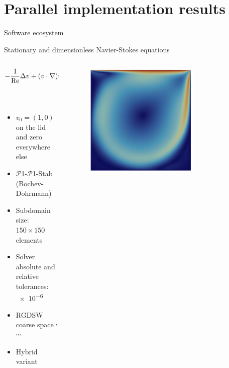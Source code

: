 \section{Parallel implementation results}

\begin{frame}{Software ecosystem}
	
\end{frame}

\begin{frame}{Stationary and dimensionless Navier-Stokes equations}
	\vspace{-5mm}
	\begin{columns}
		\begin{column}{0.6\textwidth}%
			\begin{align*}
				-\frac{1}{\rm Re} \Delta v + (v \cdot \nabla)v + \nabla p & = 0 \;   & {\rm in}\; \Omega           \\
				{\rm div}(v)                                          & = 0 \;   & {\rm in} \; \Omega          \\
				v                                                     & = v_0 \; & {\rm on} \; \partial \Omega
			\end{align*}
			\vspace{-4mm}
			\begin{itemize}
				\item $v_0=(1,0)$ on the lid and zero everywhere else
                \item $\mathcal{P}$1-$\mathcal{P}$1-Stab (Bochev-Dohrmann) \footnotemark{}
				\item Subdomain size: $150\times 150$ elements
				\item Solver absolute and relative tolerances: \num{e-6}
        \item RGDSW coarse space \footnotemark[5]$^,$\footnotemark[6]$^,$\footnotemark[7]$^,$\footnotemark[8]$^,$\footnotemark[9]
                \item Hybrid variant
			\end{itemize}
		\end{column}
		\begin{column}{0.4\textwidth}
			\begin{figure}
				\centering
				\includegraphics[width=0.7\textwidth]{images/ldc.png}

\end{figure}
\end{column}
\end{columns}
\end{frame}
